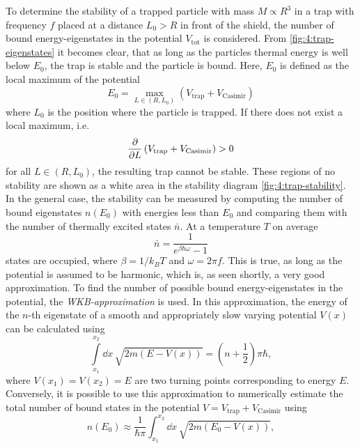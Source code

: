 To determine the stability of a trapped particle with mass $M \propto R^3$ in a trap with frequency $f$ placed at a distance $L_0 > R$ in front of the shield, the number of bound energy-eigenstates in the potential $V_\mathrm{tot}$ is considered.
From \cref{fig:4:trap-eigenstates} it becomes clear, that as long as the particles thermal energy is well below $E_0$, the trap is stable and the particle is bound.
Here, $E_0$ is defined as the local maximum of the potential 
\begin{equation}
  E_0 = \max_{L\in(R,L_0)} \left( V_\mathrm{trap} + V_\mathrm{Casimir} \right)
\end{equation}
where $L_0$ is the position where the particle is trapped.
If there does not exist a local maximum, i.e.
\begin{equation}
  \pdv{L} \left( V_\mathrm{trap} + V_\mathrm{Casimir} \right) > 0
\end{equation}
for all $L \in (R, L_0)$, the resulting trap cannot be stable. These regions of no stability are shown as a white area in the stability diagram \cref{fig:4:trap-stability}.
In the general case, the stability can be measured by computing the number of bound eigenstates $n(E_0)$ with energies less than $E_0$ and comparing them with the number of thermally excited states $\bar{n}$.
At a temperature $T$ on average 
\begin{equation}
  \bar{n} = \frac{1}{e^{\beta \hbar \omega} - 1}
\end{equation}
states are occupied, where $\beta = 1/k_B T$ and $\omega = 2\pi f$. This is true, as long as the potential is assumed to be harmonic, which is, as seen shortly, a very good approximation.
To find the number of possible bound energy-eigenstates in the potential, the \emph{WKB-approximation} \cite{Schleich_2001} is used.
In this approximation, the energy of the $n$-th eigenstate of a smooth and appropriately slow varying potential $V(x)$ can be calculated using \cite[p. 163]{Schleich_2001}
\begin{equation}
  \int\limits_{x_1}^{x_2} \dd x \, \sqrt{2m(E-V(x))} = \left(n + \frac{1}{2}\right)\pi\hbar ,
\end{equation}
where $V(x_1) = V(x_2) = E$ are two turning points corresponding to energy $E$.
Conversely, it is possible to use this approximation to numerically estimate the total number of bound states in the potential $V = V_\mathrm{trap} + V_\mathrm{Casimir}$ using
\begin{equation}
  n(E_0) \approx \frac{1}{\hbar \pi} \int_{x_1}^{x_2} \dd x \, \sqrt{2m(E_0 - V(x))},
\end{equation}
